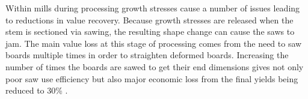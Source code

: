 Within mills during processing growth stresses cause a number of issues leading
to reductions in value recovery. Because growth stresses are released when the
stem is sectioned via sawing, the resulting shape change
can cause the saws to jam. The main value loss at this stage of processing comes
from the need to saw boards multiple times in order to straighten deformed boards.
Increasing the number of times the boards are sawed to get their end dimensions
gives not only poor saw use efficiency but also major economic loss from the
final yields being reduced to 30\% \cite{yamamoto2007slides}.
